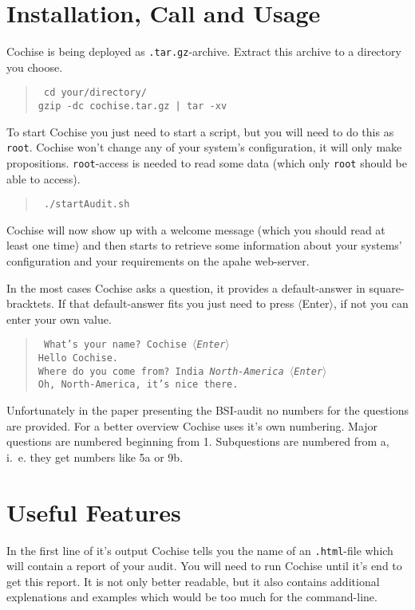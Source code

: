 \documentclass{article}
\newenvironment{code}{\begin{quote}\tt}{\end{quote}}
\begin{document}
\section{Installation, Call and Usage}
Cochise is being deployed as \texttt{.tar.gz}-archive. Extract this archive to a directory you choose.
\begin{code}
	cd your/directory/\\
	gzip -dc cochise.tar.gz | tar -xv
\end{code}
\par
To start Cochise you just need to start a script, but you will need to do this as \texttt{root}. Cochise won't change any of your system's
configuration, it will only make propositions. \texttt{root}-access is needed to read some data (which only \texttt{root} should be able to
access). 
\begin{code}
	./startAudit.sh
\end{code}
Cochise will now show up with a welcome message (which you should read at least one time) and then starts to retrieve some information
about your systems' configuration and your requirements on the apahe web-server.
\par
In the most cases Cochise asks a question, it provides a default-answer in square-bracktets. If that default-answer fits you just need
to press \textsf{\small$\langle$Enter$\rangle$}, if not you can enter your own value.
\begin{code}
	What's your name? \lbrack Cochise\rbrack \emph{ \textsf{\small$\langle$Enter$\rangle$}}\\
	Hello Cochise.\\
	Where do you come from? \lbrack India\rbrack \emph{ North-America \textsf{\small$\langle$Enter$\rangle$}}\\
	Oh, North-America, it's nice there.
\end{code}
\par
Unfortunately in the paper presenting the BSI-audit no numbers for the questions are provided. For a better overview Cochise uses it's own
numbering. Major questions are numbered beginning from 1. Subquestions are numbered from \textsf{a}, i.~e. they get numbers like \textsf{5a}
or \textsf{9b}.

\section{Useful Features}

In the first line of it's output Cochise tells you the name of an \texttt{.html}-file which will contain a report of your audit. You will
need to run Cochise until it's end to get this report. It is not only better readable, but it also contains additional explenations and
examples which would be too much for the command-line.
\end{document}
